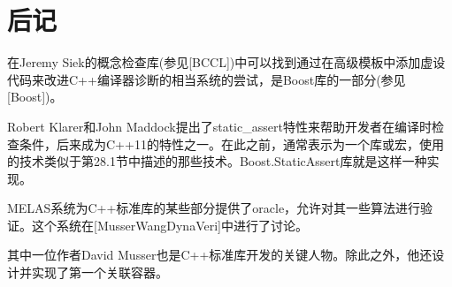 \section{后记}
在Jeremy Siek的概念检查库(参见[BCCL])中可以找到通过在高级模板中添加虚设代码来改进C++编译器诊断的相当系统的尝试，是Boost库的一部分(参见[Boost])。

Robert Klarer和John Maddock提出了static\_assert特性来帮助开发者在编译时检查条件，后来成为C++11的特性之一。在此之前，通常表示为一个库或宏，使用的技术类似于第28.1节中描述的那些技术。Boost.StaticAssert库就是这样一种实现。

MELAS系统为C++标准库的某些部分提供了oracle，允许对其一些算法进行验证。这个系统在[MusserWangDynaVeri]中进行了讨论。

\begin{notice}
其中一位作者David Musser也是C++标准库开发的关键人物。除此之外，他还设计并实现了第一个关联容器。
\end{notice}
